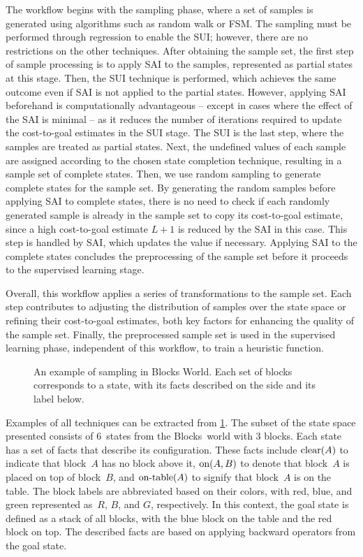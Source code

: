The workflow begins with the sampling phase, where a set of samples is generated using algorithms such as random walk or FSM. The sampling must be performed through regression to enable the SUI; however, there are no restrictions on the other techniques.
After obtaining the sample set, the first step of sample processing is to apply SAI to the samples, represented as partial states at this stage. Then, the SUI technique is performed, which achieves the same outcome even if SAI is not applied to the partial states. However, applying SAI beforehand is computationally advantageous -- except in cases where the effect of the SAI is minimal -- as it reduces the number of iterations required to update the cost-to-goal estimates in the SUI stage.
The SUI is the last step, where the samples are treated as partial states. Next, the undefined values of each sample are assigned according to the chosen state completion technique, resulting in a sample set of complete states.
Then, we use random sampling to generate complete states for the sample set. By generating the random samples before applying SAI to complete states, there is no need to check if each randomly generated sample is already in the sample set to copy its cost-to-goal estimate, since a high cost-to-goal estimate $L+1$ is reduced by the SAI in this case. This step is handled by SAI, which updates the value if necessary. Applying SAI to the complete states concludes the preprocessing of the sample set before it proceeds to the supervised learning stage.

Overall, this workflow applies a series of transformations to the sample set. Each step contributes to adjusting the distribution of samples over the state space or refining their cost-to-goal estimates, both key factors for enhancing the quality of the sample set. Finally, the preprocessed sample set is used in the supervised learning phase, independent of this workflow, to train a heuristic function.

\begin{figure}[tb]
    \caption[An example of sampling in Blocks World.]{An example of sampling in Blocks World. Each set of blocks corresponds to a state, with its facts described on the side and its label below.}
    \label{fig:example}
    \addmargin
    \centering
    
\end{figure}

Examples of all techniques can be extracted from \cref{fig:example}. The subset of the state space presented consists of $6$~states from the Blocks~world with $3$ blocks. Each state has a set of facts that describe its configuration. These facts include $\text{clear}(A)$ to indicate that block~$A$ has no block above it, $\text{on}(A,B)$ to denote that block~$A$ is placed on top of block~$B$, and $\text{on-table}(A)$ to signify that block~$A$ is on the table. The block labels are abbreviated based on their colors, with red, blue, and green represented as~$R$, $B$, and $G$, respectively. In this context, the goal state is defined as a stack of all blocks, with the blue block on the table and the red block on top. The described facts are based on applying backward operators from the goal state.

